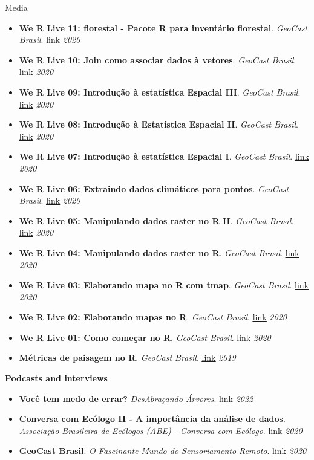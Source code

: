 \documentclass{resume}
\begin{document}
\begin{rSection}{Media}
\begin{itemize}
\item {\bf We R Live 11: florestal - Pacote R para inventário florestal}. {\it GeoCast Brasil}. \href{https://youtu.be/xOgsVywKADI}{\underline{link}} \hfill{\em 2020}
\item {\bf We R Live 10: Join como associar dados à vetores}. {\it GeoCast Brasil}. \href{https://youtu.be/BvURukaIDM0}{\underline{link}} \hfill{\em 2020}
\item {\bf We R Live 09: Introdução à estatística Espacial III}. {\it GeoCast Brasil}. \href{https://youtu.be/eaR7pTsQFDQ}{\underline{link}} \hfill{\em 2020}
\item {\bf We R Live 08: Introdução à Estatística Espacial II}. {\it GeoCast Brasil}. \href{https://youtu.be/BCl_V-SpQec}{\underline{link}} \hfill{\em 2020}
\item {\bf We R Live 07: Introdução à estatística Espacial I}. {\it GeoCast Brasil}. \href{https://youtu.be/fHWD4qyKj84}{\underline{link}} \hfill{\em 2020}
\item {\bf We R Live 06: Extraindo dados climáticos para pontos}. {\it GeoCast Brasil}. \href{https://youtu.be/-_ODMFDU6ck}{\underline{link}} \hfill{\em 2020}
\item {\bf We R Live 05: Manipulando dados raster no R II}. {\it GeoCast Brasil}. \href{https://youtu.be/AKJo_Q0dsMI}{\underline{link}} \hfill{\em 2020}
\item {\bf We R Live 04: Manipulando dados raster no R}. {\it GeoCast Brasil}. \href{https://youtu.be/dFC9SuGLuX8}{\underline{link}} \hfill{\em 2020}
\item {\bf We R Live 03: Elaborando mapa no R com tmap}. {\it GeoCast Brasil}. \href{https://youtu.be/BmlM25XQ3QA}{\underline{link}} \hfill{\em 2020}
\item {\bf We R Live 02: Elaborando mapas no R}. {\it GeoCast Brasil}. \href{https://youtu.be/eHht0n3Ppcg}{\underline{link}} \hfill{\em 2020}
\item {\bf We R Live 01: Como começar no R}. {\it GeoCast Brasil}. \href{https://youtu.be/ZORFVdwtJ1U}{\underline{link}} \hfill{\em 2020}
\item {\bf Métricas de paisagem no R}. {\it GeoCast Brasil}. \href{https://youtu.be/RCTrLx_33D8}{\underline{link}} \hfill{\em 2019}
\end{itemize} 

{\bf Podcasts and interviews}
\begin{itemize} 
\item {\bf Você tem medo de errar?} {\it DesAbraçando Árvores}. \href{https://www.desabrace.com.br/092-voce-tem-medo-de-errar/}{\underline{link}} \hfill{\em 2022} 
\item {\bf Conversa com Ecólogo II - A importância da análise de dados}. {\it Associação Brasileira de Ecólogos (ABE) - Conversa com Ecólogo}. \href{https://www.instagram.com/p/CFQVjMtH6qk/}{\underline{link}} \hfill{\em 2020}
\item {\bf GeoCast Brasil}. {\it O Fascinante Mundo do Sensoriamento Remoto}. \href{https://open.spotify.com/episode/0Kn5k9039vM8bZgb4YdlJJ?si=S5hfhNc6S6GfDFaJSsaQDA}{\underline{link}} \hfill{\em 2020}
\end{itemize} 


\end{rSection}
\end{document}
